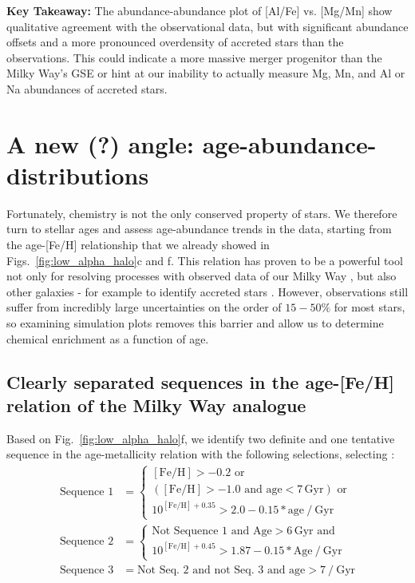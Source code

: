 \documentclass[fleqn,usenatbib]{mnras}
\begin{document}
\textbf{Key Takeaway:} The abundance-abundance plot of [Al/Fe] vs. [Mg/Mn] show qualitative agreement with the observational data, but with significant abundance offsets and a more pronounced overdensity of accreted stars than the observations. This could indicate a more massive merger progenitor than the Milky Way's GSE or hint at our inability to actually measure Mg, Mn, and Al or Na abundances of accreted stars.

\section{A new (?) angle: age-abundance-distributions}\label{sec:Age-abundance}

Fortunately, chemistry is not the only conserved property of stars. We therefore turn to stellar ages and assess age-abundance trends in the data, starting from the age-[Fe/H] relationship that we already showed in Figs.~\ref{fig:low_alpha_halo}c and f. This relation has proven to be a powerful tool not only for resolving processes with observed data of our Milky Way \citep[e.g.][]{Twarog1980, Edvardsson1993, Nordstroem2004, Casagrande2011, Feuillet2019, Xiang2022}, but also other galaxies - for example to identify accreted stars \citep[e.g.][]{Pinna2019b, Martig2021}. However, observations still suffer from incredibly large uncertainties on the order of $15-50\%$ for most stars, so examining simulation plots removes this barrier and allow us to determine chemical enrichment as a function of age.

\subsection{Clearly separated sequences in the age-[Fe/H] relation of the Milky Way analogue} \label{sec:age-feh-sequences}

Based on Fig.~\ref{fig:low_alpha_halo}f, we identify two definite and one tentative sequence in the age-metallicity relation with the following selections, selecting :
\begin{align}
    \text{Sequence~1} &= \begin{cases}
        \mathrm{[Fe/H] > -0.2} \text{ or} \\
        (\mathrm{[Fe/H]} > -1.0 \text{ and } \mathrm{age} < 7\,\mathrm{Gyr}) \text{ or} \\
        10^{\mathrm{[Fe/H]} + 0.35} > 2.0 - 0.15*\mathrm{age}~/~\mathrm{Gyr}
    \end{cases} \label{eq:sequence1} \\
    \text{Sequence~2} &= \begin{cases}
        \text{Not Sequence~1 and }\mathrm{Age} > 6\,\mathrm{Gyr} \text{ and} \\
        10^{\mathrm{[Fe/H]} + 0.45} > 1.87 - 0.15*\mathrm{Age}~/~\mathrm{Gyr}
    \end{cases}  \label{eq:sequence2} \\
    \text{Sequence~3} &= \text{Not Seq.~2 and not Seq.~3 and } \mathrm{age} > 7~/~\mathrm{Gyr}  \label{eq:sequence3}
\end{align}
\end{document}
